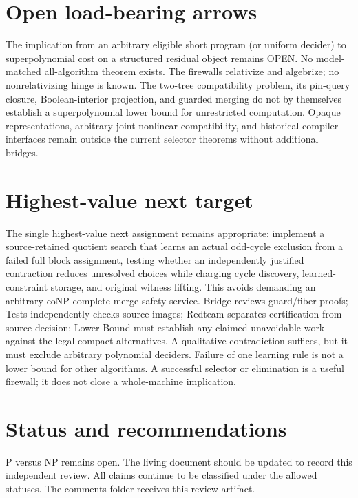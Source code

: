 \documentclass[11pt]{article}
\begin{document}
\section{Open load-bearing arrows}
The implication from an arbitrary eligible short program (or uniform decider) to superpolynomial cost on a structured residual object remains OPEN. No model-matched all-algorithm theorem exists. The firewalls relativize and algebrize; no nonrelativizing hinge is known. The two-tree compatibility problem, its pin-query closure, Boolean-interior projection, and guarded merging do not by themselves establish a superpolynomial lower bound for unrestricted computation. Opaque representations, arbitrary joint nonlinear compatibility, and historical compiler interfaces remain outside the current selector theorems without additional bridges.

\section{Highest-value next target}
The single highest-value next assignment remains appropriate: implement a source-retained quotient search that learns an actual odd-cycle exclusion from a failed full block assignment, testing whether an independently justified contraction reduces unresolved choices while charging cycle discovery, learned-constraint storage, and original witness lifting. This avoids demanding an arbitrary coNP-complete merge-safety service. Bridge reviews guard/fiber proofs; Tests independently checks source images; Redteam separates certification from source decision; Lower Bound must establish any claimed unavoidable work against the legal compact alternatives. A qualitative contradiction suffices, but it must exclude arbitrary polynomial deciders. Failure of one learning rule is not a lower bound for other algorithms. A successful selector or elimination is a useful firewall; it does not close a whole-machine implication.

\section{Status and recommendations}
P versus NP remains open. The living document should be updated to record this independent review. All claims continue to be classified under the allowed statuses. The comments folder receives this review artifact.

\end{document}
